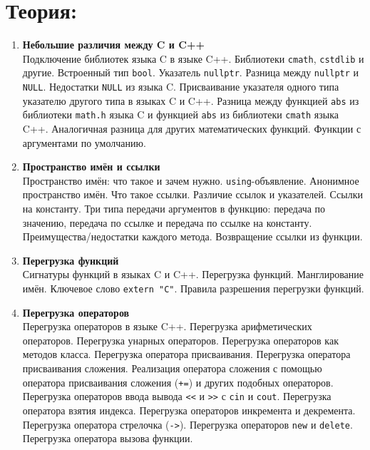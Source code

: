 \documentclass{article}
\begin{document}

\section*{Теория:}
\begin{enumerate}

\item \textbf{Небольшие различия между C и C++}\\
Подключение библиотек языка C в языке C++. Библиотеки \texttt{cmath}, \texttt{cstdlib} и другие. Встроенный тип \texttt{bool}. Указатель \texttt{nullptr}. Разница между \texttt{nullptr} и \texttt{NULL}. Недостатки \texttt{NULL} из языка C. Присваивание указателя одного типа указателю другого типа в языках C и C++. Разница между функцией \texttt{abs} из библиотеки \texttt{math.h} языка C и функцией \texttt{abs} из библиотеки \texttt{cmath} языка C++. Аналогичная разница для других математических функций. Функции с аргументами по умолчанию.

\item \textbf{Пространство имён и ссылки}\\
Пространство имён: что такое и зачем нужно. \texttt{using}-объявление. Анонимное пространство имён. Что такое ссылки. Различие ссылок и указателей. Ссылки на константу. Три типа передачи аргументов в функцию: передача по значению, передача по ссылке и передача по ссылке на константу. Преимущества/недостатки каждого метода. Возвращение ссылки из функции.   



\item  \textbf{Перегрузка функций}\\
Сигнатуры функций в языках C и C++. Перегрузка функций. Манглирование имён. Ключевое слово \texttt{extern "C"}. Правила разрешения перегрузки функций. 


\item \textbf{Перегрузка операторов}\\
Перегрузка операторов в языке C++. Перегрузка арифметических операторов. Перегрузка унарных операторов. Перегрузка операторов как методов класса. Перегрузка оператора присваивания. Перегрузка оператора присваивания сложения. Реализация оператора сложения с помощью оператора присваивания сложения (\texttt{+=}) и других подобных операторов. Перегрузка операторов ввода вывода \verb|<<| и \verb|>>| с \texttt{cin} и \texttt{cout}. Перегрузка оператора взятия индекса. Перегрузка операторов инкремента и декремента. Перегрузка оператора стрелочка (\texttt{->}). Перегрузка операторов \texttt{new} и \texttt{delete}. Перегрузка оператора вызова функции.


\end{enumerate}
\end{document}
